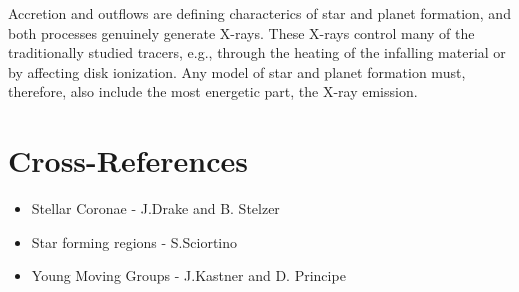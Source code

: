 \documentclass[graybox, nosecnum]{svmult}
\begin{document}
Accretion and outflows are defining characterics of star and planet formation, and both processes genuinely generate X-rays. These X-rays control many of the traditionally studied tracers, e.g., through the heating of the infalling  material or by affecting disk ionization. Any model of star and planet formation must, therefore, also include the most energetic part, the X-ray emission.





\section{Cross-References}
\begin{itemize}
    \item Stellar Coronae  - J.Drake and B. Stelzer  
    \item Star forming regions - S.Sciortino   
    \item Young Moving Groups - J.Kastner and D. Principe
\end{itemize}



\end{document}
